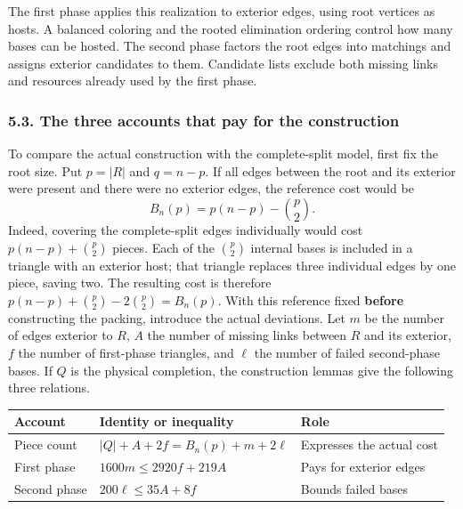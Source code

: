 \documentclass[english,11pt,a4paper]{article}
\newcounter{none}
\begin{document}
The first phase applies this realization to exterior edges, using root vertices as hosts. A balanced coloring and the rooted elimination ordering control how many bases can be hosted. The second phase factors the root edges into matchings and assigns exterior candidates to them. Candidate lists exclude both missing links and resources already used by the first phase.

\subsubsection{5.3. The three accounts that pay for the construction}\label{the-three-accounts-that-pay-for-the-construction}

To compare the actual construction with the complete-split model, first fix the root size. Put \(p=|R|\) and \(q=n-p\). If all edges between the root and its exterior were present and there were no exterior edges, the reference cost would be \[
B_n(p)=p(n-p)-\binom p2.
\] Indeed, covering the complete-split edges individually would cost \(p(n-p)+\binom p2\) pieces. Each of the \(\binom p2\) internal bases is included in a triangle with an exterior host; that triangle replaces three individual edges by one piece, saving two. The resulting cost is therefore \(p(n-p)+\binom p2-2\binom p2=B_n(p)\). With this reference fixed \textbf{before} constructing the packing, introduce the actual deviations. Let \(m\) be the number of edges exterior to \(R\), \(A\) the number of missing links between \(R\) and its exterior, \(f\) the number of first-phase triangles, and \(\ell\) the number of failed second-phase bases. If \(Q\) is the physical completion, the construction lemmas give the following three relations.


{\def\LTcaptype{none} %
\begin{longtable}[c]{@{}
  >{\raggedright\arraybackslash}p{}
  >{\raggedright\arraybackslash}p{}
  >{\raggedright\arraybackslash}p{}@{}}
\toprule\noalign{}
\begin{minipage}[b]{\linewidth}\raggedright
Account
\end{minipage} & \begin{minipage}[b]{\linewidth}\raggedright
Identity or inequality
\end{minipage} & \begin{minipage}[b]{\linewidth}\raggedright
Role
\end{minipage} \\
\midrule\noalign{}
\endhead
\bottomrule\noalign{}
\endlastfoot
Piece count & \(|Q|+A+2f=B_n(p)+m+2\ell\) & Expresses the actual cost \\
First phase & \(1600m\le2920f+219A\) & Pays for exterior edges \\
Second phase & \(200\ell\le35A+8f\) & Bounds failed bases \\
\end{longtable}
}
\end{document}

